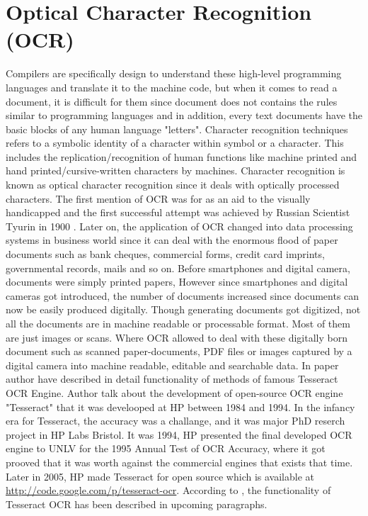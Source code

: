 \section{Optical Character Recognition (OCR)}
Compilers are specifically design to understand these high-level programming languages and translate it to the machine code, but when it comes to read a document, it is difficult for them since document does not contains the rules similar to programming languages and in addition, every text documents have the basic blocks of any human language "letters". Character recognition techniques refers to a symbolic identity of a character within symbol or a character. This includes the replication/recognition of human functions like machine printed and hand printed/cursive-written characters by machines. Character recognition is known as optical character recognition since it deals with optically processed characters. The first mention of OCR was for as an aid to the visually handicapped and the first successful attempt was achieved by Russian Scientist Tyurin in 1900 \cite{govindan1990character}. Later on, the application of OCR changed into data processing systems in business world since it can deal with the enormous flood of paper documents such as bank cheques, commercial forms, credit card imprints, governmental records, mails and so on. Before smartphones and digital camera, documents were simply printed papers, However since smartphones and digital cameras got introduced, the number of documents increased since documents can now be easily produced digitally. Though generating documents got digitized, not all the documents are in machine readable or processable format. Most of them are just images or scans. Where OCR allowed to deal with these digitally born document such as scanned paper-documents, PDF files or images captured by a digital camera into machine readable, editable and searchable data. In paper \citep{AnOverviewoftheTesseractOCREngine} author have described in detail functionality of methods of famous Tesseract OCR Engine. Author talk about the development of open-source OCR engine "Tesseract" that it was develooped at HP between 1984 and 1994. In the infancy era for Tesseract, the accuracy was a challange, and it was major PhD reserch project in HP Labs Bristol. It was 1994, HP presented the final developed OCR engine to UNLV for the 1995 Annual Test of OCR Accuracy\cite{UNLV_4th_annual_test_ocr}, where it got prooved that it was worth against the commercial engines that exists that time. Later in 2005, HP made Tesseract for open source which is available at \url{http://code.google.com/p/tesseract-ocr}. According to \cite{AnOverviewoftheTesseractOCREngine}, the functionality of Tesseract OCR has been described in upcoming paragraphs.

